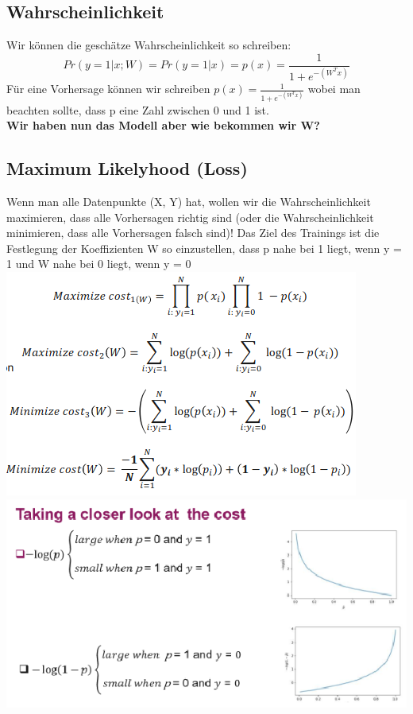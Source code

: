 \subsection{Wahrscheinlichkeit}
Wir können die geschätze Wahrscheinlichkeit so schreiben:
$$Pr(y=1|x;W) = Pr(y=1 | x) = p(x) = \frac{1}{1+e^{-(W^Tx)}}$$
Für eine Vorhersage können wir schreiben $ p(x) = \frac{1}{1+e^{-(W^Tx)}}$ wobei man beachten sollte, dass p eine Zahl zwischen 0 und 1 ist.\\
\textbf{Wir haben nun das Modell aber wie bekommen wir W?}
\subsection{Maximum Likelyhood (Loss)}
Wenn man alle Datenpunkte (X, Y) hat, wollen wir die Wahrscheinlichkeit maximieren, dass alle Vorhersagen richtig sind (oder die Wahrscheinlichkeit minimieren, dass alle Vorhersagen falsch sind)!
Das Ziel des Trainings ist die Festlegung der Koeffizienten W so einzustellen, dass p nahe bei 1 liegt, wenn y = 1 und W nahe bei 0 liegt, wenn y = 0
\includegraphics[width=\linewidth]{img/maximum_likelyhood.png}
\includegraphics[width=\linewidth]{img/maximum_likelyhood_cost.png}